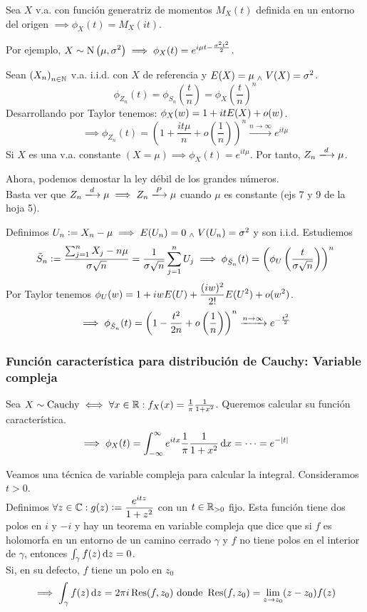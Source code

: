 \begin{teo}
	Sea $X$ v.a. con función generatriz de momentos $M_X(t)$ definida en un entorno del origen $\implies \phi_X(t) = M_X(it)$.
\end{teo}

Por ejemplo, $\displaystyle X \sim \operatorname{N}\left(\mu, \sigma^2\right) \implies \phi_X(t) = e^{i\mu t - \frac{\sigma^2t^2}{2}}$.

\begin{dem}
	Sean $\left(X_n\right)_{n\in \mathbb{N}}$ v.a. i.i.d. con $X$ de referencia y $E(X) = \mu \; _{\wedge} \; V(X) = \sigma^2$.
	\[\phi_{Z_n}(t) = \phi_{S_n}\left(\frac{t}{n}\right) = \phi_X\left(\frac{t}{n}\right)^n\]
	Desarrollando por Taylor tenemos: $\displaystyle \phi_X(w) = 1 + it E(X) + o(w)$.
	\[\implies \phi_{Z_n}(t) = \left(1 + \frac{it\mu}{n} + o\left(\frac{1}{n}\right)\right)^n \xrightarrow{n\to\infty} e^{it\mu}\]
	Si $X$ es una v.a. constante $(X=\mu) \implies \phi_X(t) = e^{it\mu}$. Por tanto, $Z_n \xlongrightarrow{d} \mu$.

	Ahora, podemos demostar la ley débil de los grandes números.\\
	Basta ver que $Z_n \xlongrightarrow{d} \mu \implies Z_n \xlongrightarrow{P} \mu$ cuando $\mu$ es constante (ejs 7 y 9 de la hoja 5).

	Definimos $U_n \vcentcolon= X_n - \mu \implies E(U_n) = 0 \; _{\wedge} \; V(U_n) = \sigma^2$ y son i.i.d. Estudiemos
	\[ \tilde{S}_n \vcentcolon= \frac{\sum_{j=1}^n X_j - n\mu}{\sigma \sqrt{n}} = \frac{1}{\sigma\sqrt{n}}\sum_{j=1}^n U_j \implies \phi_{\tilde{S}_n}(t) = \left(\phi_U\left(\frac{t}{\sigma\sqrt{n}}\right)\right)^n\]
	Por Taylor tenemos $\displaystyle \phi_U(w) = 1 + iw E(U) + \frac{(iw)^2}{2!}E(U^2) + o(w^2) $.
	\[\implies \phi_{\tilde{S}_n}(t) = \left(1 - \frac{t^2}{2n} + o\left(\frac{1}{n}\right)\right)^n \xrightarrow{n\to\infty} e^{-\frac{t^2}{2}}\]
\end{dem}

\subsubsection{Función característica para distribución de Cauchy: Variable compleja}

Sea $X\sim\operatorname{Cauchy} \iff \forall x \in \mathbb{R} : f_X(x) = \frac{1}{\pi} \frac{1}{1+x^2}$. Queremos calcular su función característica.
\[\implies \phi_X(t) = \int_{-\infty}^{\infty} e^{itx} \frac{1}{\pi} \frac{1}{1+x^2}\odif{x} = \cdots = e^{-\abs{t}}\]

Veamos una técnica de variable compleja para calcular la integral. Consideramos $t>0$.\\
Definimos $\displaystyle \forall z \in \mathbb{C} : g(z) \vcentcolon= \frac{e^{itz}}{1+z^2}$ con un $t\in\mathbb{R}_{>0}$ fijo. Esta función tiene dos polos en $i$ y $-i$ y hay un teorema en variable compleja que dice que si $f$ es holomorfa en un entorno de un camino cerrado $\gamma$ y $f$ no tiene polos en el interior de $\gamma$, entonces $\int_{\gamma} f(z)\odif{z} = 0$. \\
Si, en su defecto, $f$ tiene un polo en $z_0$
\[\implies \int_{\gamma} f(z)\odif{z} = 2\pi i \operatorname{Res}(f, z_0) \tex{ donde }\operatorname{Res}(f, z_0) = \lim_{z\to z_0} (z-z_0)f(z)\]

